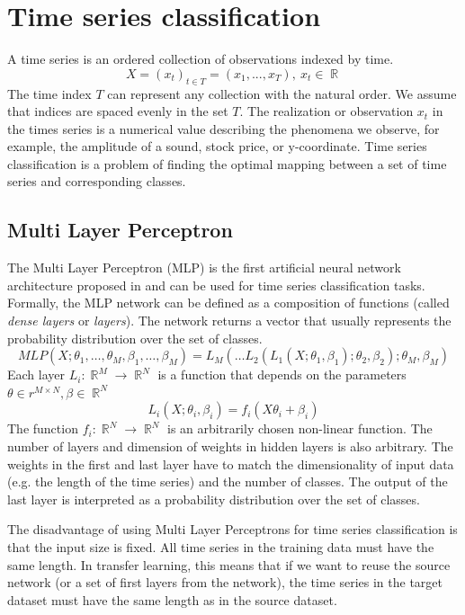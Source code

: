 \documentclass[a4paper,11pt,twoside]{report}
\theoremstyle{definition}
\DeclareMathOperator{\real}{\mathbb{R}}
\begin{document}
\section{Time series classification}
A time series is an ordered collection of observations indexed by time.
$$X = (x_t)_{t\in T} = (x_1, ... , x_T),\ x_t\in \real$$
The time index $T$ can represent any collection with the natural order. We assume that indices are spaced evenly in the set $T$. The realization or observation $x_t$ in the times series is a numerical value describing the phenomena we observe, for example, the amplitude of a sound, stock price, or y-coordinate. Time series classification is a problem of finding the optimal mapping between a set of time series and corresponding classes.



\subsection{Multi Layer Perceptron}\label{mlp_section_related}
The Multi Layer Perceptron (MLP) is the first artificial neural network architecture proposed in \cite{dl_tsc} and can be used for time series classification tasks.
Formally, the MLP network can be defined as a composition of functions (called \textit{dense layers} or \textit{layers}). The network returns a vector that usually represents the probability distribution over the set of classes.
$$MLP(X; \theta_1,\dots , \theta_M, \beta_1,\dots , \beta_M) = L_M(\dots L_2(L_1(X;\theta_1, \beta_1);\theta_2, \beta_2);\theta_M, \beta_M)$$
Each layer $L_i: \real^M \rightarrow \real^N$ is a function that depends on the parameters $\theta \in r^{M\times N}, \beta \in \real^N$
$$L_i(X ; \theta_i, \beta_i) = f_i(X \theta_i  + \beta_i)$$
The function $f_i: \real^N \rightarrow \real^N$ is an arbitrarily chosen non-linear function. The number of layers and dimension of weights in hidden layers is also arbitrary. The weights in the first and last layer have to match the dimensionality of input data (e.g. the length of the time series) and the number of classes. The output of the last layer is interpreted as a probability distribution over the set of classes.

The disadvantage of using Multi Layer Perceptrons for time series classification is that the input size is fixed. All time series in the training data must have the same length. In transfer learning, this means that if we want to reuse the source network (or a set of first layers from the network), the time series in the target dataset must have the same length as in the source dataset.
\end{document}
